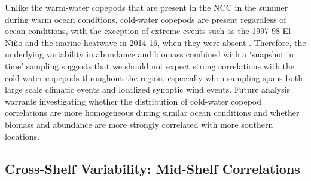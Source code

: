 \documentclass[preprint, authoryear, 12pt]{elsarticle}
\begin{document}
Unlike the warm-water copepods that are present in the NCC in the summer during warm ocean conditions, cold-water copepods are present regardless of ocean conditions, with the exception of extreme events such as the 1997-98 El Ni{\~n}o and the marine heatwave in 2014-16, when they were absent \citep{fisher2015impact, peterson2017pelagic}. Therefore, the underlying variability in abundance and biomass combined with a ‘snapshot in time’ sampling suggests that we should not expect strong correlations with the cold-water copepods throughout the region, especially when sampling spans both large scale climatic events and localized synoptic wind events. Future analysis warrants investigating whether the distribution of cold-water copepod correlations are more homogeneous during similar ocean conditions and whether biomass and abundance are more strongly correlated with more southern locations.

\subsection{Cross-Shelf Variability: Mid-Shelf Correlations}
\end{document}
